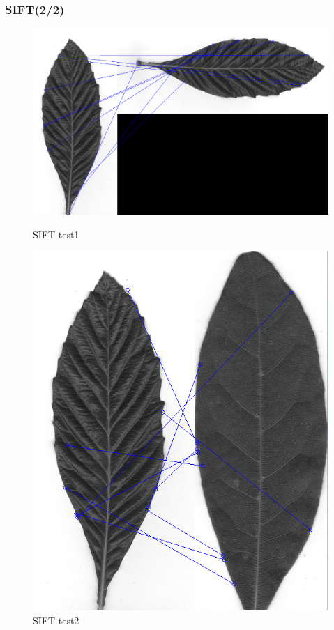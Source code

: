 \documentclass[xcolor=table]{beamer}
\begin{document}
\begin{frame} \frametitle{SIFT(2/2)}
\begin{figure}[htbp]
    \begin{minipage}[c]{.45\linewidth}
      \begin{center}
	\includegraphics[scale=0.20]{Capture1.png}
	\caption{SIFT test1}
	\label{figure:Illustration}
      \end{center}
    \end{minipage}
    \hfill
    \begin{minipage}[c]{.45\linewidth}
      \begin{center}
	\includegraphics[scale=0.20]{Capture.png}
	\caption{SIFT test2}
	\label{figure:Illustration}
      \end{center}
    \end{minipage}
  \end{figure}
\end{frame}
\end{document}
